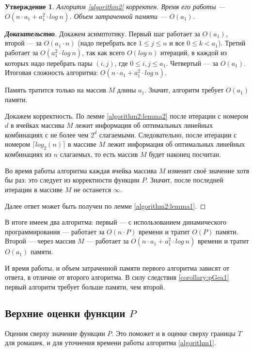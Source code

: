 \documentclass[12pt]{article}
\newtheorem{proposition}[theorem]{Утверждение}
\begin{document}
\begin{proposition}
Алгоритм \ref{algorithm2} корректен. Время его работы --- $O(n \cdot a_1 + a_1^2 \cdot log \ n)$. Объем затраченной памяти --- $O(a_1)$.
\end{proposition}
\begin{proof}[\textbf{Доказательство}]
Докажем асимптотику. Первый шаг работает за $O(a_1)$, второй --- за $O(a_1 \cdot n)$ (надо перебрать все $1 \le j \le n$ и все $0 \le k < a_1$). Третий работает за $O(a_1^2 \cdot log \ n)$, так как всего $O(log \ n)$ итераций, в каждой из которых надо перебрать пары $(i, j)$, где $0 \le i, j \le a_1$. Четвертый --- за $O(a_1)$. Итоговая сложность алгоритма: $O(n \cdot a_1 + a_1^2 \cdot log \ n)$.

Память тратится только на массив $M$ длины $a_1$. Значит, алгоритм требует $O(a_1)$ памяти.

Докажем корректность. По лемме \ref{algorithm2:lemma2} после итерации с номером $d$ в ячейках массива $M$ лежит информация об оптимальных линейных комбинациях с не более чем $2^d$ слагаемыми. Следовательно, после итерации с номером $\lceil log_2(n) \rceil$ в массиве $M$ лежит информация об оптимальных линейных комбинациях из $n$ слагаемых, то есть массив $M$ будет наконец посчитан.

Во время работы алгоритма каждая ячейка массива $M$ изменит своё значение хотя бы раз: это следует из корректности функции $P$. Значит, после последней итерации в массиве $M$ не останется $\infty$.

Далее ответ может быть получен по лемме \ref{algorithm2:lemma1}.
\end{proof}

В итоге имеем два алгоритма: первый --- с использованием динамического программирования --- работает за $O(n \cdot P)$ времени и тратит $O(P)$ памяти. Второй --- через массив $M$ --- работает за $O(n \cdot a_1 + a_1^2 \cdot log \ n)$ времени и тратит $O(a_1)$ памяти.

И время работы, и объем затраченной памяти первого алгоритма зависят от ответа, в отличие от второго алгоритма. В силу следствия \ref{corollary:pGea1} первый алгоритм требует больше памяти, чем второй.

\subsection{Верхние оценки функции $P$}
Оценим сверху значение функции $P$. Это поможет и в оценке сверху границы $T$ для ромашек, и для уточнения времени работы алгоритма \ref{algorithm1}.
\end{document}
